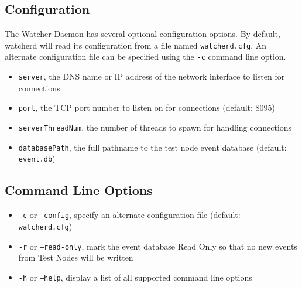 \subsection{Configuration}

The Watcher Daemon has several optional configuration options.  By default,
watcherd will read its configuration from a file named {\tt watcherd.cfg}.  An
alternate configuration file can be specified using the {\tt -c} command line
option.

\begin{itemize}
\item {\tt server}, the DNS name or IP address of the network interface to listen for
connections
\item {\tt port}, the TCP port number to listen on for connections (default: 8095)
\item {\tt serverThreadNum}, the number of threads to spawn for handling connections
\item {\tt databasePath}, the full pathname to the test node event database (default:
{\tt event.db})
\end{itemize}

\subsection{Command Line Options}

\begin{itemize}
\item {\tt -c} or {\tt --config}, specify an alternate configuration file (default: {\tt
watcherd.cfg})
\item {\tt -r} or {\tt --read-only}, mark the event database Read Only so that no
new events from Test Nodes will be written
\item {\tt -h} or {\tt --help}, display a list of all supported command line
options
\end{itemize}

